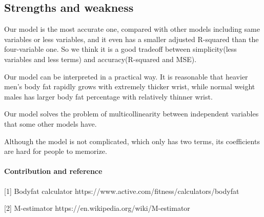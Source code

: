 \documentclass[11pt]{article}
\begin{document}
    \subsection{Strengths and weakness}\label{strengths-and-weakness}

    Our model is the most accurate one, compared with other models including
same variables or less variables, and it even has a smaller adjusted
R-squared than the four-variable one. So we think it is a good tradeoff
between simplicity(less variables and less terms) and accuracy(R-squared
and MSE).

Our model can be interpreted in a practical way. It is reasonable that
heavier men's body fat rapidly grows with extremely thicker wrist, while
normal weight males has larger body fat percentage with relatively
thinner wrist.

Our model solves the problem of multicollinearity between independent
variables that some other models have.

Although the model is not complicated, which only has two terms, its
coefficients are hard for people to memorize.

    \paragraph{Contribution and reference}\label{contribution-and-reference}

    {[}1{]} Bodyfat calculator
https://www.active.com/fitness/calculators/bodyfat

{[}2{]} M-estimator https://en.wikipedia.org/wiki/M-estimator


    
    
    
    
\end{document}
